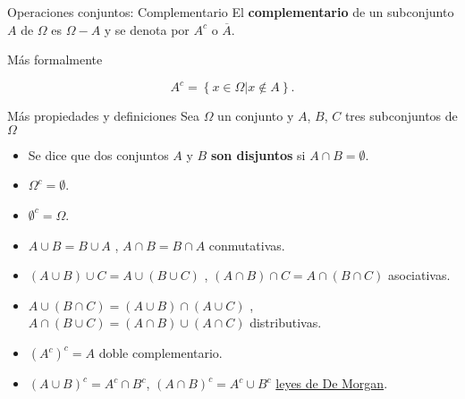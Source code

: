 \documentclass[
  ignorenonframetext,
  aspectratio=169]{beamer}
\providecommand{\tightlist}{%
  \setlength{\itemsep}{0pt}\setlength{\parskip}{0pt}}\usepackage{longtable,booktabs,array}
\begin{document}
\begin{frame}{Operaciones conjuntos: Complementario}
\protect\hypertarget{operaciones-conjuntos-complementario}{}
El \textbf{complementario} de un subconjunto \(A\) de \(\Omega\) es
\(\Omega-A\) y se denota por \(A^c\) o \(\overline{A}\).

Más formalmente

\[
A^c=\left\{x\in\Omega \big| x\not\in A\right\}.
\]
\end{frame}

\begin{frame}{Más propiedades y definiciones}
\protect\hypertarget{muxe1s-propiedades-y-definiciones}{}
Sea \(\Omega\) un conjunto y \(A\), \(B\), \(C\) tres subconjuntos de
\(\Omega\)

\begin{itemize}
\tightlist
\item
  Se dice que dos conjuntos \(A\) y \(B\) \textbf{son disjuntos} si
  \(A\cap B=\emptyset.\)
\item
  \(\Omega^c=\emptyset\).
\item
  \(\emptyset^c=\Omega\).
\item
  \(A\cup B=B \cup A\) , \(A\cap B=B\cap A\) conmutativas.
\item
  \((A\cup B) \cup C = A \cup( B \cup C)\) ,
  \((A\cap B) \cap C = A \cap( B \cap C)\) asociativas.
\item
  \(A\cup (B\cap C)=(A\cup B) \cap (A\cup C)\) ,
  \(A\cap (B\cup C)=(A\cap B) \cup (A\cap C)\) distributivas.
\item
  \(\left(A^c\right)^c=A\) doble complementario.
\item
  \(\left(A\cup B\right)^c=A^c \cap B^c\),
  \(\left(A\cap B\right)^c=A^c \cup B^c\)
  \href{https://es.wikipedia.org/wiki/Leyes_de_De_Morgan}{leyes de De
  Morgan}.
\end{itemize}
\end{frame}
\end{document}
